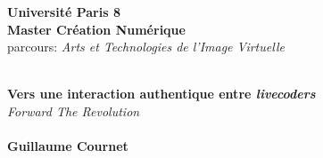 \begin{titlepage}
\begin{center}

{\LARGE \textbf{Université Paris 8}}\\[1.5cm]

{\Large \textbf{Master Création Numérique}}\\[0.25cm]

{\Large parcours: \textit{Arts et Technologies de l'Image Virtuelle}}%

\vfill


\HRule \\[0.2cm]
{\LARGE \bfseries 
Vers une interaction authentique entre \textit{livecoders}}
\\[0.4cm]
{\Large \textit{Forward The Revolution}}
\HRule \\[1.5cm]
\HRule \\[0.4cm]
{\large \textbf{Guillaume Cournet}}\\
\HRule \\[1.5cm]


\vfill

\end{center}
\end{titlepage}
